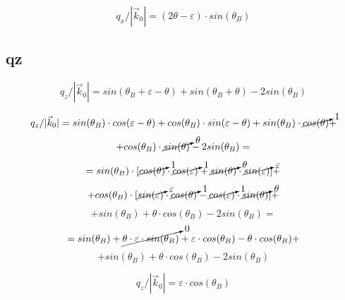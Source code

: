 \begin{equation}
	q_x/|\vec{k}_0| = (2\theta -\varepsilon) \cdot sin(\theta_B)
\end{equation}




\subsection*{qz}
  \begin{equation}
  	q_z/|\vec{k}_0| = sin(\theta_B + \varepsilon -  \theta )+
  	sin(\theta_B + \theta) - 2 sin(\theta_B)
  \end{equation}

  $$
  	q_z/|\vec{k}_0| =   sin(\theta_B) \cdot cos( \varepsilon  -  \theta )+
  	cos(\theta_B) \cdot sin( \varepsilon  -  \theta )+
  	sin(\theta_B) \cdot \cancelto{1}{cos(\theta)}  +
  $$
  $$
  	+cos(\theta_B) \cdot\cancelto{\theta}{sin(\theta)} - 2sin(\theta_B) =
  $$
  $$
  	=  sin(\theta_B) \cdot [\cancelto{1}{cos(\theta)} \cdot \cancelto{1}{cos(\varepsilon)} +\cancelto{\theta}{sin(\theta)} \cdot \cancelto{\varepsilon}{sin(\varepsilon)}
  	]+
  $$
  $$
  	+cos(\theta_B) \cdot [\cancelto{\varepsilon}{sin(\varepsilon)} \cdot
  	 \cancelto{1}{cos(\theta)} - \cancelto{1}{cos(\varepsilon)}  \cdot
  	 \cancelto{\theta}{sin(\theta)}
  	 ]+
  $$
  $$
  	+sin(\theta_B) + \theta \cdot cos(\theta_B)  - 2sin(\theta_B) =
  $$
  $$
  	= sin(\theta_B) +\cancelto{0}{  \theta \cdot \varepsilon \cdot sin(\theta_B)} +			\varepsilon  \cdot  cos(\theta_B)  - \theta  \cdot  cos(\theta_B) +
  $$
  $$
  	+sin(\theta_B) + \theta  \cdot  cos(\theta_B)  - 2sin(\theta_B)
  $$

  \begin{equation}
  	q_z/|\vec{k}_0| = \varepsilon  \cdot  cos(\theta_B)
  \end{equation}
